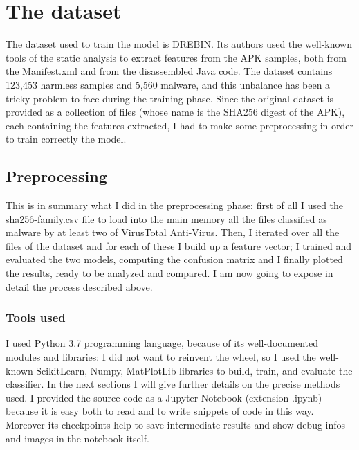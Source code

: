 \documentclass[12pt]{article}
\begin{document}
\section{The dataset}
The dataset used to train the model is DREBIN. Its authors used the well-known tools of the static analysis to extract features from the APK samples, both from the Manifest.xml and from the disassembled Java code. The dataset contains 123,453 harmless samples and 5,560 malware, and this unbalance has been a tricky problem to face during the training phase. Since the original dataset is provided as a collection of files (whose name is the SHA256 digest of the APK), each containing the features extracted, I had to make some preprocessing in order to train correctly the model. 

\subsection{Preprocessing}
This is in summary what I did in the preprocessing phase: first of all I used the sha256-family.csv file to load into the main memory all the files classified as malware by at least two of VirusTotal Anti-Virus. Then, I iterated over all the files of the dataset and for each of these I build up a feature vector; I trained and evaluated the two models, computing the confusion matrix and I finally plotted the results, ready to be analyzed and compared. I am now going to expose in detail the process described above. 

\subsubsection{Tools used}
I used Python 3.7 programming language, because of its well-documented modules and libraries: I did not want to reinvent the wheel, so I used the well-known ScikitLearn, Numpy, MatPlotLib libraries to build, train, and evaluate the classifier. In the next sections I will give further details on the precise methods used.
I provided the source-code as a Jupyter Notebook (extension .ipynb) because it is easy both to read and to write snippets of code in this way. Moreover its checkpoints help to save intermediate results and show debug infos and images in the notebook itself.
\end{document}
